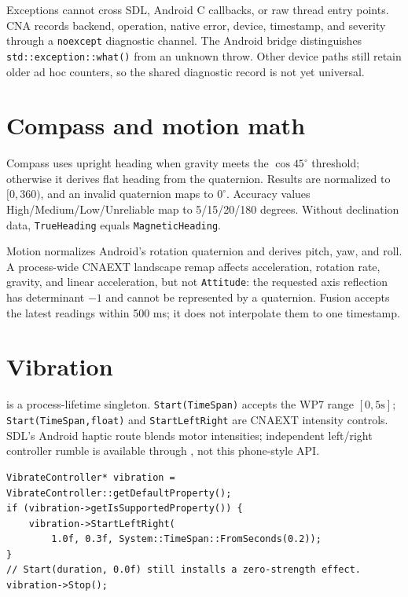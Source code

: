 Exceptions cannot cross SDL, Android C callbacks, or raw thread entry points. CNA records
backend, operation, native error, device, timestamp, and severity through a \texttt{noexcept}
diagnostic channel. The Android bridge distinguishes \texttt{std::exception::what()} from an
unknown throw. Other device paths still retain older ad hoc counters, so the shared diagnostic
record is not yet universal.

\section{Compass and motion math}

Compass uses upright heading when gravity meets the $\cos 45^\circ$ threshold; otherwise it
derives flat heading from the quaternion. Results are normalized to $[0,360)$, and an invalid
quaternion maps to $0^\circ$. Accuracy values High/Medium/Low/Unreliable map to 5/15/20/180
degrees. Without declination data, \texttt{TrueHeading} equals \texttt{MagneticHeading}.

Motion normalizes Android's rotation quaternion and derives pitch, yaw, and roll. A process-wide
CNAEXT landscape remap affects acceleration, rotation rate, gravity, and linear acceleration,
but not \texttt{Attitude}: the requested axis reflection has determinant $-1$ and cannot be
represented by a quaternion. Fusion accepts the latest readings within 500 ms; it does not
interpolate them to one timestamp.

\section{Vibration}

 is a process-lifetime singleton. \texttt{Start(TimeSpan)} accepts
the WP7 range $[0,5\text{s}]$; \texttt{Start(TimeSpan,float)} and
\texttt{StartLeftRight} are CNAEXT intensity controls. SDL's Android haptic route blends motor
intensities; independent left/right controller rumble is available through ,
not this phone-style API.

\begin{lstlisting}
VibrateController* vibration = VibrateController::getDefaultProperty();
if (vibration->getIsSupportedProperty()) {
    vibration->StartLeftRight(
        1.0f, 0.3f, System::TimeSpan::FromSeconds(0.2));
}
// Start(duration, 0.0f) still installs a zero-strength effect.
vibration->Stop();
\end{lstlisting}

